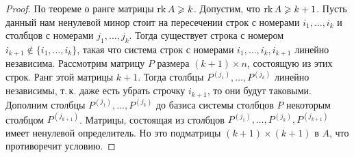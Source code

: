 \begin{proof}
    По теореме о ранге матрицы $\mathrm{rk}\, A \geqslant k$. Допустим, что $\mathrm{rk}\, A \geqslant k + 1$. Пусть данный нам ненулевой минор стоит на пересечении строк с номерами $i_1, \ldots, i_k$ и столбцов с номерами $j_1, \ldots, j_k$. Тогда существует строка с номером $i_{k + 1} \notin \{i_1, \ldots, i_k\}$, такая что система строк с номерами $i_1, \ldots, i_k, i_{k + 1}$ линейно независима. Рассмотрим матрицу $P$ размера $(k + 1) \times n$, состоящую из этих строк. Ранг этой матрицы $k + 1$. Тогда столбцы $P^{(j_1)}, \ldots, P^{(j_k)}$ линейно независимы, т.\,к. даже есть убрать строчку $i_{k + 1}$, то они будут таковыми. Дополним столбцы $P^{(j_1)}, \ldots, P^{(j_k)}$ до базиса системы столбцов $P$ некоторым столбцом $P^{(j_{k + 1})}$. Матрицы, состоящая из столбцов $P^{(j_1)}, \ldots, P^{(j_k)}, P^{(j_{k + 1})}$ имеет ненулевой определитель. Но это подматрицы $(k + 1) \times (k + 1)$ в $A$, что противоречит условию.
\end{proof}

